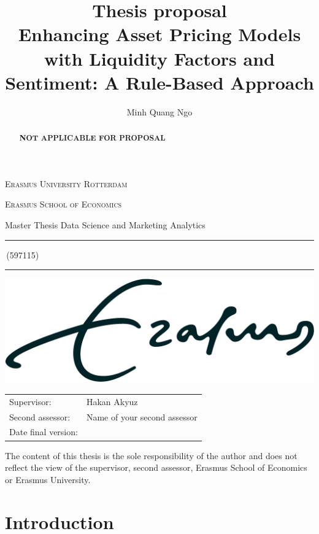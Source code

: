 \documentclass[a4paper,11pt]{article}
\author{Minh Quang Ngo}
\title{Thesis proposal \\ Enhancing Asset Pricing Models with Liquidity Factors and Sentiment: A Rule-Based Approach}
\newcommand{\studentnumber}{597115}
\newcommand{\program}{Data Science and Marketing Analytics}
\newcommand{\supervisor}{Hakan Akyuz}
\newcommand{\secondassesor}{Name of your second assessor}
\begin{document}
\begin{titlepage}
\makeatletter
\begin{center}
	\textsc{Erasmus University Rotterdam}
	\par \textsc{Erasmus School of Economics}
	\par Master Thesis \program

	\vfill \hrule height .08em \bigskip
	\par\huge\@title\bigskip
	\par\Large\@author\,(\studentnumber)\bigskip
	\hrule height .08em\normalsize
	
	\vfill
	\includegraphics[width=\textwidth,height=0.15\textheight,keepaspectratio]{eur} %
	\vfill
	
	\begin{tabular}{ll}
		\toprule
		Supervisor: & \supervisor\\
		Second assessor: & \secondassesor\\
		Date final version: & \@date\\
		\bottomrule
	\end{tabular}
	
	\vfill
	The content of this thesis is the sole responsibility of the author and does not reflect the view of the supervisor, second assessor, Erasmus School of Economics or Erasmus University.
\end{center}
\makeatother
\end{titlepage}

\begin{abstract}
	\textbf{NOT APPLICABLE FOR PROPOSAL}
\end{abstract}
\newpage

\tableofcontents
\newpage

\section{Introduction}
    
\end{document}
